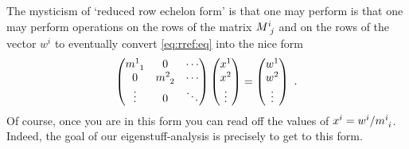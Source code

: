 \documentclass[12pt, oneside]{report}    %
\begin{document}
The mysticism of `reduced row echelon form' is that one may perform is that one may perform operations on the rows of the matrix $M\aij{i}{j}$ and on the rows of the vector $w^i$ to eventually convert \eqref{eq:rref:eq} into the nice form
\begin{align}
    \begin{pmatrix}
        m\aij{1}{1} & 0 & \cdots \\
        0 & m\aij{2}{2} & \cdots \\
        \vdots  &0 & \ddots 
    \end{pmatrix}
    \begin{pmatrix}
        x^1 \\
        x^2 \\
        \vdots
    \end{pmatrix}
    =
    \begin{pmatrix}
        w^1 \\
        w^2 \\
        \vdots 
    \end{pmatrix} \ .
\end{align}
Of course, once you are in this form you can read off the values of $x^i = w^i/m\aij{i}{i}$. Indeed, the goal of our eigenstuff-analysis is precisely to get to this form. 
\end{document}
